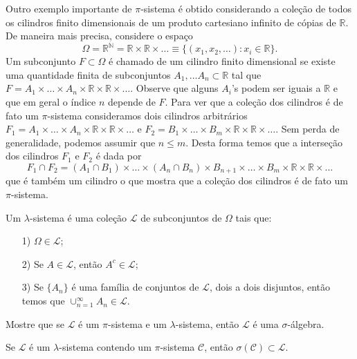 Outro exemplo importante de $\pi$-sistema é obtido 
considerando a coleção de todos os cilindros finito
dimensionais de um produto cartesiano
infinito de cópias de $\mathbb{R}$.
De maneira mais precisa, considere o espaço 
\[
\Omega 
= 
{\mathbb{R}}^{\mathbb{N}}
=
\mathbb{R}\times\mathbb{R}\times\ldots 
\equiv
\{(x_1,x_2,\ldots): x_i\in\mathbb{R} \}.
\]
Um subconjunto $F\subset \Omega$ é
chamado de um cilindro finito dimensional 
se existe uma quantidade finita de subconjuntos
$A_1,\ldots A_n\subset \mathbb{R}$ tal que 
$
F 
= 
A_1\times\ldots\times A_n\times \mathbb{R}\times\mathbb{R}\times\ldots$.
Observe que alguns $A_i$'s podem ser iguais a $\mathbb{R}$ e que 
em geral o índice $n$ depende de $F$.
Para ver que a coleção dos cilindros é de fato um 
$\pi$-sistema consideramos dois cilindros arbitrários
$F_1=A_1\times\ldots\times A_n\times \mathbb{R}\times\mathbb{R}\times\ldots$
e 
$F_2=B_1\times\ldots\times B_m\times \mathbb{R}\times\mathbb{R}\times\ldots$.
Sem perda de generalidade, podemos assumir que $n\leq m$.
Desta forma temos que a interseção dos cilindros $F_1$ e $F_2$ é dada por 
\[
F_1\cap F_2 
= 
(A_1\cap B_1)\times\ldots\times (A_n\cap B_n)\times B_{n+1}\times\ldots\times B_m
\times \mathbb{R}\times\mathbb{R}\times\ldots
\]
que é também um cilindro o que mostra que a coleção dos cilindros é
de fato um $\pi$-sistema.
\begin{definicao}
    Um $\lambda$-sistema é uma coleção $\mathcal{L}$ de subconjuntos
    de $\Omega$ tais que:
    \begin{itemize}
        \item[1)] $ \Omega \in \mathcal{L}$;
        \item[2)] Se $ A \in \mathcal{L}$, então $ A^c \in \mathcal{L} $;
        \item[3)] Se $ \{A_n\}$ é uma família de conjuntos de $\mathcal{L}$, dois a
        dois disjuntos, então temos que $ \cup_{n=1}^{\infty} A_n \in \mathcal{L} $.
     \end{itemize}
\end{definicao}

\begin{exercicio}
    \label{pi-lamda-sigma}
    Mostre que se $\mathcal{L}$ é um $\pi$-sistema e um $\lambda$-sistema, então
    $\mathcal{L}$ é uma $\sigma$-álgebra.   
\end{exercicio}

\begin{teorema}
    \label{pi-lambda}
    Se $\mathcal{L}$ é um $\lambda$-sistema contendo um $\pi$-sistema 
    $\mathcal{C}$, então $ \sigma(\mathcal{C}) \subset \mathcal{L}$.
\end{teorema}

